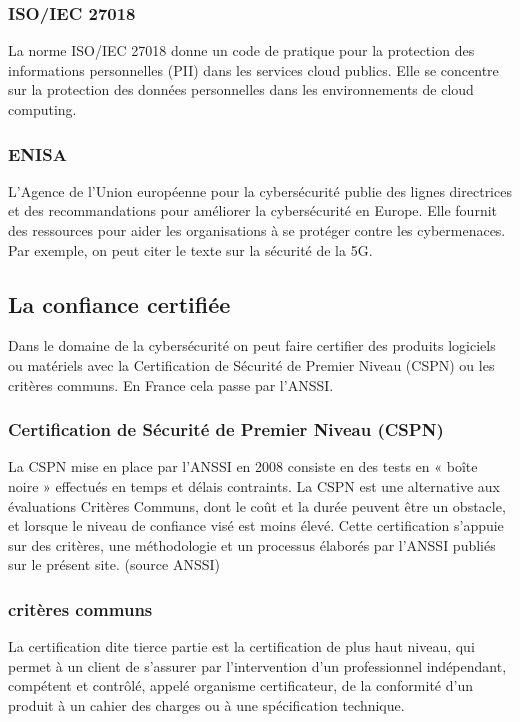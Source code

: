 \subsubsection{ISO/IEC 27018}
La norme ISO/IEC 27018 donne un code de pratique pour la protection des informations personnelles (PII) dans les services cloud publics. Elle se concentre sur la protection des données personnelles dans les environnements de cloud computing.
	
\subsubsection{ENISA}
L'Agence de l'Union européenne pour la cybersécurité publie des lignes directrices et des recommandations pour améliorer la cybersécurité en Europe. Elle fournit des ressources pour aider les organisations à se protéger contre les cybermenaces. Par exemple, on peut citer le texte sur la sécurité de la 5G.
	
\subsection{La confiance certifiée}
Dans le domaine de la cybersécurité on peut faire certifier des produits logiciels ou matériels avec la Certification de Sécurité de Premier Niveau (CSPN) ou les critères communs. En France cela passe par l'ANSSI.

\subsubsection{Certification de Sécurité de Premier Niveau (CSPN)}
La CSPN mise en place par l’ANSSI en 2008 consiste en des tests en « boîte noire » effectués en temps et délais contraints. La CSPN est une alternative aux évaluations Critères Communs, dont le coût et la durée peuvent être un obstacle, et lorsque le niveau de confiance visé est moins élevé. Cette certification s’appuie sur des critères, une méthodologie et un processus élaborés par l’ANSSI publiés sur le présent site.
(source ANSSI)

\subsubsection{critères communs}
La certification dite tierce partie est la certification de plus haut niveau, qui permet à un client de s’assurer par l’intervention d’un professionnel indépendant, compétent et contrôlé, appelé organisme certificateur, de la conformité d’un produit à un cahier des charges ou à une spécification technique. 


